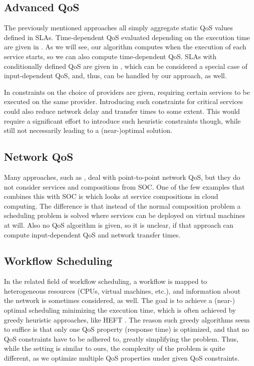 \documentclass[10pt, conference, compsocconf]{IEEEtran}
\begin{document}
\subsection{Advanced QoS}
\noindent The previously mentioned approaches all simply aggregate static QoS values defined in SLAs.
Time-dependent QoS evaluated depending on the execution time are given in \cite{Kloepper2010}.
As we will see, our algorithm computes when the execution of each service starts,
	so we can also compute time-dependent QoS.
SLAs with conditionally defined QoS are given in \cite{Klein2009},
	which can be considered a special case of input-dependent QoS,
		and, thus, can be handled by our approach, as well. 

In \cite{Menasce2009} constraints on the choice of providers are given,
	requiring certain services to be executed on the same provider.
Introducing such constraints for critical services could also reduce network delay and transfer times to some extent.
This would require a significant effort to introduce such heuristic constraints though,
	while still not necessarily leading to a (near-)optimal solution.	

\subsection{Network QoS}
\noindent Many approaches, such as \cite{Boutaba2005,Jin2007}, deal with point-to-point network QoS,
	but they do not consider services and compositions from SOC.
One of the few examples that combines this with SOC is \cite{Ye2011}
	which looks at service compositions in cloud computing.
The difference is that instead of the normal composition problem a scheduling problem is solved where services can be deployed on virtual machines at will.
Also no QoS algorithm is given, so it is unclear, if that approach can compute input-dependent QoS and network transfer times.

\subsection{Workflow Scheduling}


\noindent In the related field of workflow scheduling,
	a workflow is mapped to heterogeneous resources (CPUs, virtual machines, etc.),
		and information about the network is sometimes considered, as well.
The goal is to achieve a \mbox{(near-)}\\optimal scheduling minimizing the execution time,
	which is often achieved by greedy heuristic approaches, like HEFT \cite{To2002}.
The reason such greedy algorithms seem to suffice is that only one QoS property (response time) is optimized,
	and that no QoS constraints have to be adhered to, greatly simplifying the problem.
Thus, while the setting is similar to ours,
	the complexity of the problem is quite different,
		as we optimize multiple QoS properties under given QoS constraints.
\end{document}

